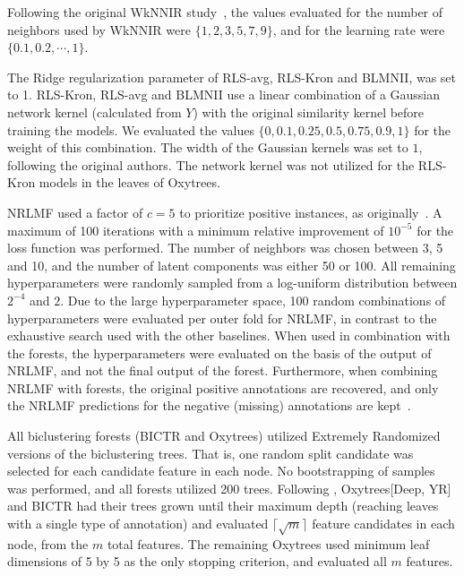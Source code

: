 \documentclass[sn-mathphys-num]{sn-jnl}%
\theoremstyle{thmstyleone}%
\theoremstyle{thmstyletwo}%
\theoremstyle{thmstylethree}%
\begin{document}
\begin{appendices}
Following the original WkNNIR study~\cite{liu_drug-target_2022}, the values evaluated for the number of neighbors used by WkNNIR were $\{1,2,3,5,7,9\}$, and for the learning rate were $\{0.1,0.2,\cdots,1\}$.

The Ridge regularization parameter of RLS-avg, RLS-Kron and BLMNII, was set to 1.
%
RLS-Kron, RLS-avg and BLMNII use a linear combination of a Gaussian network kernel (calculated from $Y$) with the original similarity kernel before training the models. We evaluated the values $\{0, 0.1, 0.25, 0.5, 0.75, 0.9, 1\}$ for the weight of this combination. The width of the Gaussian kernels was set to $1$, following the original authors.
%
The network kernel was not utilized for the RLS-Kron models in the leaves of Oxytrees.


NRLMF used a factor of $c=5$ to prioritize positive instances, as originally~\cite{liu_neighborhood_2016}. A maximum of 100 iterations with a minimum relative improvement of $10^{-5}$ for the loss function was performed. The number of neighbors was chosen between 3, 5 and 10, and the number of latent components was either 50 or 100. All remaining hyperparameters were randomly sampled from a log-uniform distribution between $2^{-4}$ and $2$. Due to the large hyperparameter space, 100 random combinations of hyperparameters were evaluated per outer fold for NRLMF, in contrast to the exhaustive search used with the other baselines. When used in combination with the forests, the hyperparameters were evaluated on the basis of the output of NRLMF, and not the final output of the forest. Furthermore, when combining NRLMF with forests, the original positive annotations are recovered, and only the NRLMF predictions for the negative (missing) annotations are kept~\cite{pliakos_drug-target_2020}.

All biclustering forests (BICTR and Oxytrees) utilized Extremely Randomized~\cite{geurts_extremely_2006} versions of the biclustering trees. That is, one random split candidate was selected for each candidate feature in each node. No bootstrapping of samples was performed, and all forests utilized 200 trees.
Following \cite{pliakos_network_2019,pliakos_drug-target_2020}, Oxytrees[Deep, YR] and BICTR had their trees grown until their maximum depth (reaching leaves with a single type of annotation) and evaluated $\lceil \sqrt{m}\rceil$ feature candidates in each node, from the $m$ total features. The remaining Oxytrees used minimum leaf dimensions of 5 by 5 as the only stopping criterion, and evaluated all $m$ features.


\end{appendices}
\end{document}
